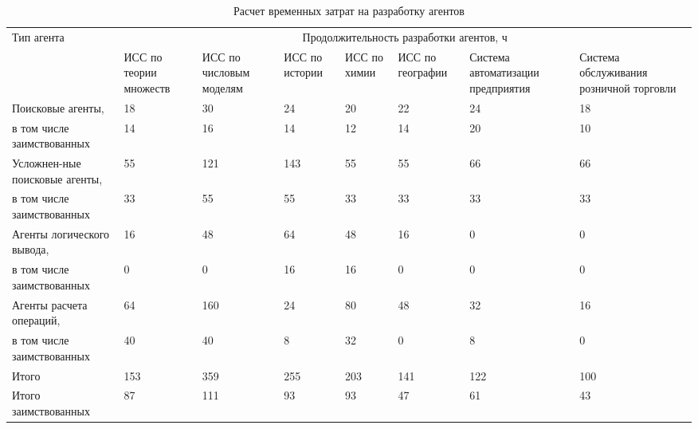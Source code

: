 \documentclass{thesisby}
\begin{document}
\begin{table} [H]
  \small
  \caption{Расчет временных затрат на разработку агентов}\label{AgentsTimeTable}
\begin{tabularx}{\hsize}{| p{2.5cm} | X | X | X | X | X | X | X |}
  \hline
 \multirow{2}{*}{Тип агента} &\multicolumn{7}{c|}{Продолжительность разработки агентов, ч}\\
 \cline{2-8}
 & ИСС по теории множеств & ИСС по числовым моделям	& ИСС по истории	& ИСС по химии	& ИСС по географии	& Система автоматизации предприятия	& Система обслуживания розничной торговли\\
\hline
Поисковые агенты,  & 18 & 30 & 24 & 20 & 22 & 24 & 18\\
\cline{2-8}
в том числе заимствованных & 14 & 16 & 14 & 12 & 14 & 20 & 10\\
\hline
Усложнен-ные поисковые агенты, & 55 & 121 & 143 & 55 & 55 & 66 & 66\\
\cline{2-8}
в том числе заимствованных & 33 & 55 & 55 & 33 & 33 & 33 & 33\\
\hline
Агенты \mbox{логического} вывода, & 16 & 48 & 64 & 48 & 16 & 0 & 0\\
\cline{2-8}
в том числе заимствованных & 0 & 0 & 16 & 16 & 0 & 0 & 0\\
\hline
Агенты расчета операций, & 64 & 160 & 24 & 80 & 48 & 32 & 16\\
\cline{2-8}
в том числе заимствованных & 40 & 40 & 8 & 32 & 0 & 8 & 0\\
\hline
Итого  & 153 & 359 & 255 & 203 & 141 & 122 & 100\\
\hline
Итого заимствованных & 87 & 111 & 93 & 93 & 47 & 61 & 43\\
\hline

\end{tabularx}
\end{table}
\end{document}
